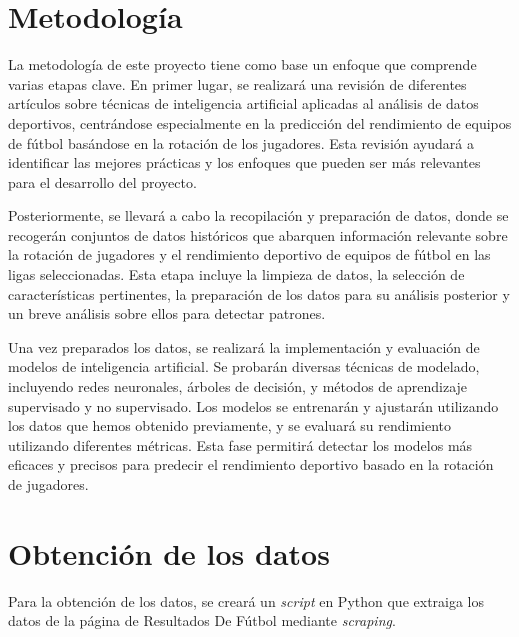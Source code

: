  
    
   


  \section{Metodología}
  La metodología de este proyecto tiene como base un enfoque que comprende varias etapas clave. En primer lugar, se realizará una revisión de diferentes artículos sobre técnicas de inteligencia artificial aplicadas al análisis de datos deportivos, centrándose especialmente en la predicción del rendimiento de equipos de fútbol basándose en la rotación de los jugadores. Esta revisión ayudará a identificar las mejores prácticas y los enfoques que pueden ser más relevantes para el desarrollo del proyecto.

  Posteriormente, se llevará a cabo la recopilación y preparación de datos, donde se recogerán conjuntos de datos históricos que abarquen información relevante sobre la rotación de jugadores y el rendimiento deportivo de equipos de fútbol en las ligas seleccionadas. Esta etapa incluye la limpieza de datos, la selección de características pertinentes, la preparación de los datos para su análisis posterior y un breve análisis sobre ellos para detectar patrones.

  Una vez preparados los datos, se realizará la implementación y evaluación de modelos de inteligencia artificial. Se probarán diversas técnicas de modelado, incluyendo redes neuronales, árboles de decisión, y métodos de aprendizaje supervisado y no supervisado. Los modelos se entrenarán y ajustarán utilizando los datos que hemos obtenido previamente, y se evaluará su rendimiento utilizando diferentes métricas. Esta fase permitirá detectar los modelos más eficaces y precisos para predecir el rendimiento deportivo basado en la rotación de jugadores.
  




  \section{Obtención de los datos}

  Para la obtención de los datos, se creará un \textit{script} en Python que extraiga los datos de la página de Resultados De Fútbol \cite{resultadosfutbol} mediante \textit{scraping}.

